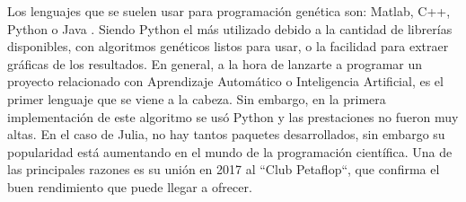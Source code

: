 Los lenguajes que se suelen usar para programación genética son: Matlab, C++, Python o Java \cite{languages}. Siendo Python el más utilizado debido a la cantidad de librerías disponibles, 
con algoritmos genéticos listos para usar, o la facilidad para extraer gráficas de los resultados. En general, a la hora de lanzarte a programar un proyecto relacionado
con Aprendizaje Automático o Inteligencia Artificial, es el primer lenguaje que se viene a la cabeza. Sin embargo, en la primera
implementación de este algoritmo se usó Python \cite{merelo_molina_2021} y las prestaciones no fueron muy altas. En el caso de
Julia, no hay tantos paquetes desarrollados, sin embargo su popularidad está aumentando en el mundo de la programación
científica. Una de las principales razones es su unión en 2017 al ``Club Petaflop``, que confirma el buen rendimiento
que puede llegar a ofrecer.  